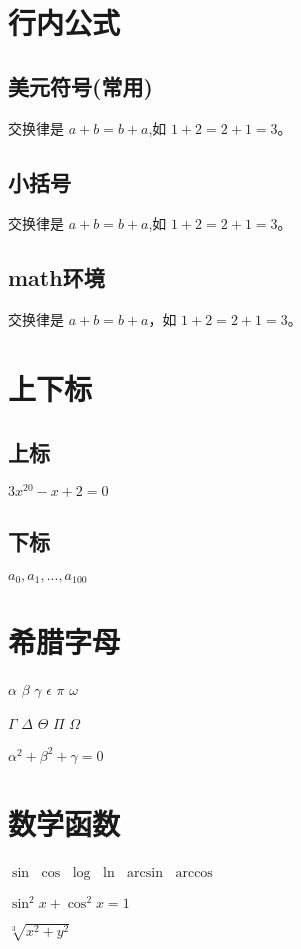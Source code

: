 \documentclass{article}
\begin{document}
	\section{行内公式}
	\subsection{美元符号(常用)} 
		交换律是 $a+b=b+a$,如 $1+2=2+1=3$。
	\subsection{小括号}
		交换律是 \(a+b=b+a\),如 \(1+2=2+1=3\)。
	\subsection{math环境}
		交换律是 
		\begin{math}
			a+b=b+a
		\end{math}，如
		\begin{math}
			1+2=2+1=3
		\end{math}。
	
	\section{上下标}
	\subsection{上标}
		$3x^{20} - x + 2 = 0$
	\subsection{下标}
		$a_0,a_1,...,a_{100}$
		
	\section{希腊字母}
		$\alpha$
		$\beta$
		$\gamma$
		$\epsilon$
		$\pi$
		$\omega$
		
		$\Gamma$
		$\Delta$
		$\Theta$
		$\Pi$
		$\Omega$
		
		$\alpha^2 + \beta^2 + \gamma = 0$
		
	\section{数学函数}
		$\sin$
		$\cos$
		$\log$
		$\ln$
		$\arcsin$
		$\arccos$
		
		$\sin^2 x + \cos^2 x = 1$
		
		$\sqrt[3]{x^2+y^2}$
		
\end{document}
